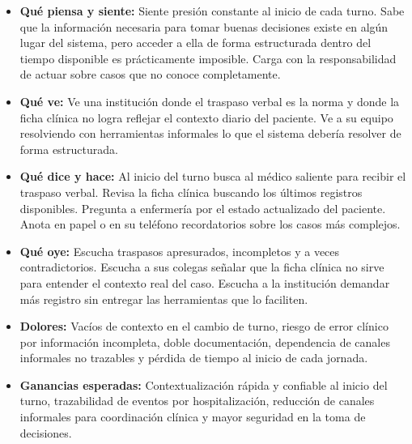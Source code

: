 \begin{itemize}
    \item \textbf{Qué piensa y siente:} Siente presión constante al inicio de cada turno. Sabe que la información necesaria para tomar buenas decisiones existe en algún lugar del sistema, pero acceder a ella de forma estructurada dentro del tiempo disponible es prácticamente imposible. Carga con la responsabilidad de actuar sobre casos que no conoce completamente.

    \item \textbf{Qué ve:} Ve una institución donde el traspaso verbal es la norma y donde la ficha clínica no logra reflejar el contexto diario del paciente. Ve a su equipo resolviendo con herramientas informales lo que el sistema debería resolver de forma estructurada.

    \item \textbf{Qué dice y hace:} Al inicio del turno busca al médico saliente para recibir el traspaso verbal. Revisa la ficha clínica buscando los últimos registros disponibles. Pregunta a enfermería por el estado actualizado del paciente. Anota en papel o en su teléfono recordatorios sobre los casos más complejos.

    \item \textbf{Qué oye:} Escucha traspasos apresurados, incompletos y a veces contradictorios. Escucha a sus colegas señalar que la ficha clínica no sirve para entender el contexto real del caso. Escucha a la institución demandar más registro sin entregar las herramientas que lo faciliten.

    \item \textbf{Dolores:} Vacíos de contexto en el cambio de turno, riesgo de error clínico por información incompleta, doble documentación, dependencia de canales informales no trazables y pérdida de tiempo al inicio de cada jornada.

    \item \textbf{Ganancias esperadas:} Contextualización rápida y confiable al inicio del turno, trazabilidad de eventos por hospitalización, reducción de canales informales para coordinación clínica y mayor seguridad en la toma de decisiones.
\end{itemize}
